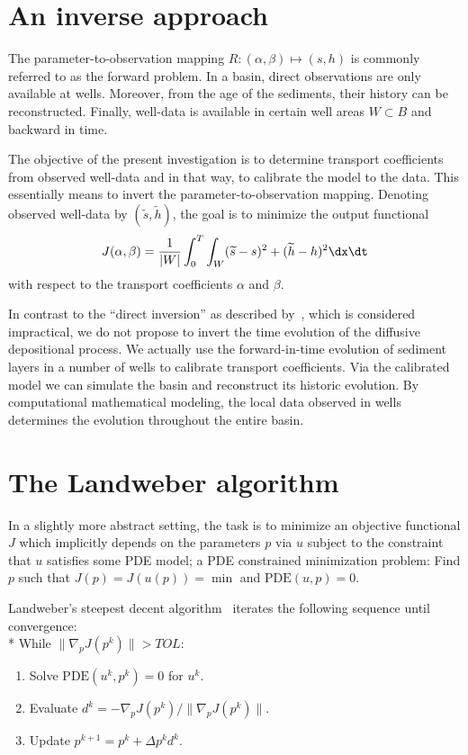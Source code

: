 \section{An inverse approach}

The parameter-to-observation mapping $R: (\alpha, \beta) \mapsto (s,
h)$ is commonly referred to as the forward problem.  In a basin, direct
observations are only available at wells. Moreover, from the age of
the sediments, their history can be reconstructed.  Finally, well-data
is available in certain well areas $W \subset B$ and backward in time.

The objective of the present investigation is to determine transport
coefficients from observed well-data and in that way, to calibrate the
model to the data. This essentially means to invert the
parameter-to-observation mapping. Denoting observed well-data by
$(\widetilde s,\widetilde h)$, the goal is to minimize the output
functional
\begin{equation} \label{eq:schroll:output}
 J(\alpha, \beta) =
 \frac{1}{|W|} \int_0^T \int_W (\widetilde s - s)^2 + (\widetilde h - h)^2  \dx \dt
\end{equation}
with respect to the transport coefficients $\alpha$ and $\beta$.

In contrast to the ``direct inversion'' as described
by~\citet{ImhofSharma2007}, which is considered impractical, we do not
propose to invert the time evolution of the diffusive depositional
process.  We actually use the forward-in-time evolution of sediment
layers in a number of wells to calibrate transport coefficients.  Via
the calibrated model we can simulate the basin and reconstruct its
historic evolution. By computational mathematical modeling, the local
data observed in wells determines the evolution throughout the entire
basin.

\section{The Landweber algorithm}

In a slightly more abstract setting, the task is to minimize an
objective functional $J$ which implicitly depends on the parameters
$p$ via $u$ subject to the constraint that $u$ satisfies some PDE
model; a PDE constrained minimization problem: Find $p$ such that
$J(p)=J(u(p))=\min$ and $\mathrm{PDE}(u,p)=0$.

Landweber's steepest decent algorithm~\citep{Landweber1951} iterates the
following sequence until convergence:
\\*
While $\| \nabla_pJ(p^k) \| > TOL$:
\begin{enumerate}
\item Solve $\mathrm{PDE}(u^k,p^k)=0$ for $u^k$.
\item Evaluate $d^k=-\nabla_pJ(p^k) / \| \nabla_pJ(p^k) \|$.
\item Update $p^{k+1}=p^k+\Delta p^k d^k$.
\end{enumerate}

